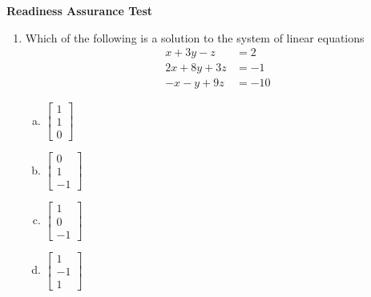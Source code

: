 \documentclass{article}
\begin{document}
\newpage
\begin{center}{\bf Readiness Assurance Test} \end{center}
\begin{enumerate}[1)]

\item Which of the following is a solution to the system of linear equations
\begin{align*}
x+3y-z &= 2\\
2x+8y+3z &=-1 \\
-x-y+9z &= -10
\end{align*}

\begin{multicols}{4}
\begin{enumerate}[(a)]
\item $\begin{bmatrix} 1 \\ 1 \\ 0 \end{bmatrix}$
\item $\begin{bmatrix} 0 \\ 1 \\ -1 \end{bmatrix}$
\item $\begin{bmatrix} 1 \\ 0 \\ -1 \end{bmatrix}$
\item $\begin{bmatrix} 1 \\ -1 \\ 1 \end{bmatrix}$
\end{enumerate}
\end{multicols}



\end{enumerate}
\end{document}
